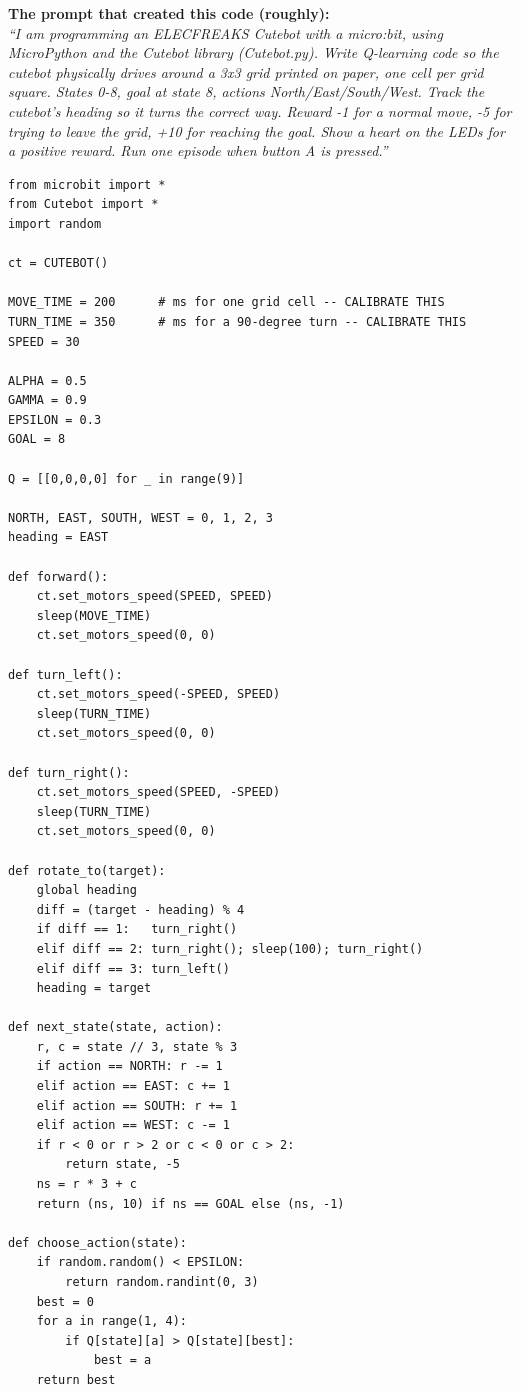 \documentclass[12pt]{article}
\begin{document}
\begin{promptbox}
\textbf{The prompt that created this code (roughly):}\\
\textit{``I am programming an ELECFREAKS Cutebot with a micro:bit, using MicroPython and the Cutebot library (Cutebot.py). Write Q-learning code so the cutebot physically drives around a 3x3 grid printed on paper, one cell per grid square. States 0-8, goal at state 8, actions North/East/South/West. Track the cutebot's heading so it turns the correct way. Reward -1 for a normal move, -5 for trying to leave the grid, +10 for reaching the goal. Show a heart on the LEDs for a positive reward. Run one episode when button A is pressed.''}
\end{promptbox}

\begin{lstlisting}[style=micropython, caption={RL\_cutebot.py -- flashed as RL\_cutebot.hex}]
from microbit import *
from Cutebot import *
import random

ct = CUTEBOT()

MOVE_TIME = 200      # ms for one grid cell -- CALIBRATE THIS
TURN_TIME = 350      # ms for a 90-degree turn -- CALIBRATE THIS
SPEED = 30

ALPHA = 0.5
GAMMA = 0.9
EPSILON = 0.3
GOAL = 8

Q = [[0,0,0,0] for _ in range(9)]

NORTH, EAST, SOUTH, WEST = 0, 1, 2, 3
heading = EAST

def forward():
    ct.set_motors_speed(SPEED, SPEED)
    sleep(MOVE_TIME)
    ct.set_motors_speed(0, 0)

def turn_left():
    ct.set_motors_speed(-SPEED, SPEED)
    sleep(TURN_TIME)
    ct.set_motors_speed(0, 0)

def turn_right():
    ct.set_motors_speed(SPEED, -SPEED)
    sleep(TURN_TIME)
    ct.set_motors_speed(0, 0)

def rotate_to(target):
    global heading
    diff = (target - heading) % 4
    if diff == 1:   turn_right()
    elif diff == 2: turn_right(); sleep(100); turn_right()
    elif diff == 3: turn_left()
    heading = target

def next_state(state, action):
    r, c = state // 3, state % 3
    if action == NORTH: r -= 1
    elif action == EAST: c += 1
    elif action == SOUTH: r += 1
    elif action == WEST: c -= 1
    if r < 0 or r > 2 or c < 0 or c > 2:
        return state, -5
    ns = r * 3 + c
    return (ns, 10) if ns == GOAL else (ns, -1)

def choose_action(state):
    if random.random() < EPSILON:
        return random.randint(0, 3)
    best = 0
    for a in range(1, 4):
        if Q[state][a] > Q[state][best]:
            best = a
    return best


\end{lstlisting}
\end{document}

